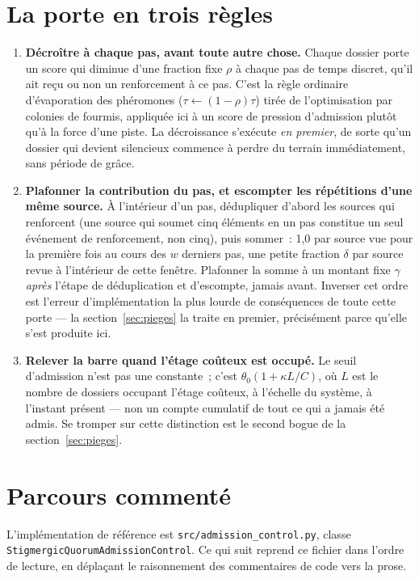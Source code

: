 \documentclass[11pt]{article}
\begin{document}
\section{La porte en trois règles}
\label{sec:rules}

\begin{enumerate}
\item \textbf{Décroître à chaque pas, avant toute autre chose.} Chaque
  dossier porte un score qui diminue d'une fraction fixe $\rho$ à chaque
  pas de temps discret, qu'il ait reçu ou non un renforcement à ce pas.
  C'est la règle ordinaire d'évaporation des phéromones
  ($\tau \leftarrow (1-\rho)\tau$) tirée de l'optimisation par colonies
  de fourmis, appliquée ici à un score de pression d'admission plutôt
  qu'à la force d'une piste. La décroissance s'exécute \emph{en premier},
  de sorte qu'un dossier qui devient silencieux commence à perdre du
  terrain immédiatement, sans période de grâce.
\item \textbf{Plafonner la contribution du pas, et escompter les
  répétitions d'une même source.} À l'intérieur d'un pas, dédupliquer
  d'abord les sources qui renforcent (une source qui soumet cinq
  éléments en un pas constitue un seul événement de renforcement, non
  cinq), puis sommer~: 1,0 par source vue pour la première fois au cours
  des $w$ derniers pas, une petite fraction $\delta$ par source revue à
  l'intérieur de cette fenêtre. Plafonner la somme à un montant fixe
  $\gamma$ \emph{après} l'étape de déduplication et d'escompte, jamais
  avant. Inverser cet ordre est l'erreur d'implémentation la plus
  lourde de conséquences de toute cette porte --- la
  section~\ref{sec:pieges} la traite en premier, précisément parce
  qu'elle s'est produite ici.
\item \textbf{Relever la barre quand l'étage coûteux est occupé.} Le
  seuil d'admission n'est pas une constante~; c'est
  $\theta_0(1 + \kappa L/C)$, où $L$ est le nombre de dossiers occupant
  l'étage coûteux, à l'échelle du système, à l'instant présent --- non un
  compte cumulatif de tout ce qui a jamais été admis. Se tromper sur
  cette distinction est le second bogue de la section~\ref{sec:pieges}.
\end{enumerate}

\section{Parcours commenté}
\label{sec:parcours}

L'implémentation de référence est \texttt{src/admission\_control.py},
classe \texttt{StigmergicQuorumAdmissionControl}. Ce qui suit reprend ce
fichier dans l'ordre de lecture, en déplaçant le raisonnement des
commentaires de code vers la prose.
\end{document}

